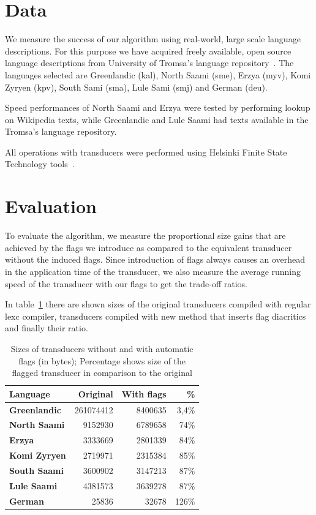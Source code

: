 \documentclass[11pt]{article}
\begin{document}
\section{Data}
\label{sec:data}

We measure the success of our algorithm using real-world, large scale
language descriptions. For this purpose we have acquired freely
available, open source language descriptions from University of
Tromsa's language repository~\cite{moshagen2013building}. The
languages selected are Greenlandic (kal), North Saami (sme), Erzya
(myv), Komi Zyryen (kpv), South Sami (sma), Lule Sami (smj) and German
(deu).

Speed performances of North Saami and Erzya were tested by performing
lookup on Wikipedia texts, while Greenlandic and Lule Saami had texts
available in the Tromsa's language repository.
 
All operations with transducers were performed using Helsinki Finite
State Technology tools~\cite{linden2011}.

\section{Evaluation}
\label{sec:evaluation}

To evaluate the algorithm, we measure the proportional size gains that
are achieved by the flags we introduce as compared to the equivalent
transducer without the induced flags. Since introduction of flags
always causes an overhead in the application time of the transducer,
we also measure the average running speed of the transducer with our
flags to get the trade-off ratios.

In table~\ref{table:sizes} there are shown sizes of the original
transducers compiled with regular lexc compiler, transducers compiled
with new method that inserts flag diacritics and finally their ratio.

\begin{table}
    \centering
    \begin{tabular}{|l|r|r|r|}
        \hline
        \bf Language & \bf Original & \bf With flags & \bf \% \\
        \hline
        \bf Greenlandic &   261074412   & 8400635 & 3,4\%  \\
        \bf North Saami &   9152930     & 6789658 & 74\%  \\
        \bf Erzya       &   3333669     & 2801339 & 84\%  \\
        \bf Komi Zyryen &   2719971     & 2315384 & 85\%  \\
        \bf South Saami &   3600902     & 3147213 & 87\%  \\
        \bf Lule Saami  &   4381573     & 3639278 & 87\%  \\
        \bf German      &   25836       & 32678   & 126\%  \\
        \hline
    \end{tabular}
    \caption{Sizes of transducers without and with automatic flags (in bytes); Percentage shows size of the flagged transducer in comparison to the original
    \label{table:sizes}}
\end{table}
\end{document}
